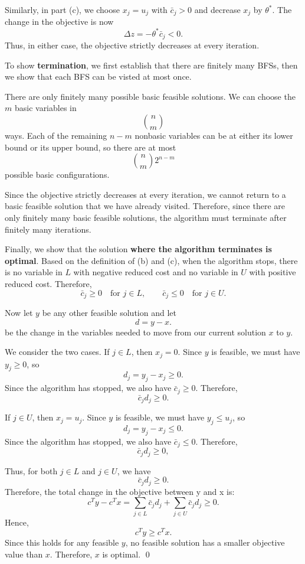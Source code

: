 \documentclass{article}
\begin{document}
Similarly, in part (c), we choose $x_j=u_j$ with $\bar c_j>0$ and
decrease $x_j$ by $\theta^*$. The change in the objective is now
\[
\Delta z=-\theta^*\bar c_j<0.
\]
Thus, in either case, the objective strictly decreases at every
iteration.


\vspace{3mm}

To show \textbf{termination}, we first establish that there are finitely many BFSs, then we show that each BFS can be visted at most once. 


There are only finitely many possible basic feasible solutions. We can
choose the $m$ basic variables in
\[
\binom{n}{m}
\]
ways. Each of the remaining $n-m$ nonbasic variables can be at either
its lower bound or its upper bound, so there are at most
\[
\binom{n}{m}2^{n-m}
\]
possible basic configurations.

Since the objective strictly decreases at every iteration, we cannot
return to a basic feasible solution that we have already visited.
Therefore, since there are only finitely many basic feasible solutions,
the algorithm must terminate after finitely many iterations.

Finally, we show that the solution \textbf{where the algorithm terminates is
optimal}. Based on the definition of (b) and (c), when the algorithm stops, there is no variable in $L$ with
negative reduced cost and no variable in $U$ with positive reduced
cost. Therefore,
\[
\bar c_j\geq0 \quad\text{for }j\in L,
\qquad
\bar c_j\leq0 \quad\text{for }j\in U.
\]

Now let $y$ be any other feasible solution and let
\[
d=y-x.
\]
be the change in the variables needed to move from
our current solution $x$ to $y$.

We consider the two cases. If $j\in L$, then $x_j=0$. Since $y$ is feasible, we must have
$y_j\geq0$, so
\[
d_j=y_j-x_j\geq0.
\]
Since the algorithm has stopped, we also have $\bar c_j\geq0$.
Therefore,
\[
\bar c_jd_j\geq0.
\]

If $j\in U$, then $x_j=u_j$. Since $y$ is feasible, we must have
$y_j\leq u_j$, so
\[
d_j=y_j-x_j\leq0.
\]
Since the algorithm has stopped, we also have $\bar c_j\leq0$.
Therefore,
\[
\bar c_jd_j\geq0,
\]


Thus, for both $j\in L$ and $j\in U$, we have
\[
\bar c_j d_j\geq0.
\]
Therefore, the total change in the objective between y and x is:  
\[
c^Ty-c^Tx
=
\sum_{j\in L}\bar c_jd_j
+
\sum_{j\in U}\bar c_jd_j
\geq0.
\]
Hence,
\[
\boxed{c^Ty\geq c^Tx.}
\]
Since this holds for any feasible $y$, no feasible solution has a 
smaller objective value than $x$. Therefore, $x$ is optimal. \qed
\end{document}
